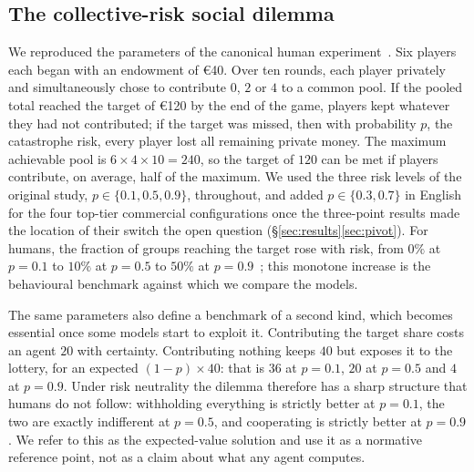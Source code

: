 \documentclass[openacc]{rsproca_new}
\begin{document}
\subsection{The collective-risk social dilemma}
We reproduced the parameters of the canonical human experiment~\cite{milinski2008collective}. Six players each began with an endowment of \euro{}40. Over ten rounds, each player privately and simultaneously chose to contribute $0$, $2$ or $4$ to a common pool. If the pooled total reached the target of \euro{}120 by the end of the game, players kept whatever they had not contributed; if the target was missed, then with probability $p$, the catastrophe risk, every player lost all remaining private money. The maximum achievable pool is $6\times4\times10=240$, so the target of $120$ can be met if players contribute, on average, half of the maximum. We used the three risk levels of the original study, $p\in\{0.1,0.5,0.9\}$, throughout, and added $p\in\{0.3,0.7\}$ in English for the four top-tier commercial configurations once the three-point results made the location of their switch the open question (\S\ref{sec:results}\ref{sec:pivot}). For humans, the fraction of groups reaching the target rose with risk, from $0\%$ at $p=0.1$ to $10\%$ at $p=0.5$ to $50\%$ at $p=0.9$~\cite{milinski2008collective}; this monotone increase is the behavioural benchmark against which we compare the models.

The same parameters also define a benchmark of a second kind, which becomes essential once some models start to exploit it. Contributing the target share costs an agent $20$ with certainty. Contributing nothing keeps $40$ but exposes it to the lottery, for an expected $(1-p)\times40$: that is $36$ at $p=0.1$, $20$ at $p=0.5$ and $4$ at $p=0.9$. Under risk neutrality the dilemma therefore has a sharp structure that humans do not follow: withholding everything is strictly better at $p=0.1$, the two are exactly indifferent at $p=0.5$, and cooperating is strictly better at $p=0.9$. We refer to this as the expected-value solution and use it as a normative reference point, not as a claim about what any agent computes.
\end{document}
